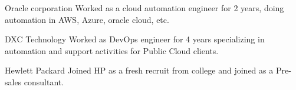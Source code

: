 

\begin{cvskills}

  \cvskill
    {Oracle corporation} %
    {Worked as a cloud automation engineer for 2 years, doing automation in AWS, Azure, oracle cloud, etc.} %
  

  \cvskill
    {DXC Technology} %
    {Worked as DevOps engineer for 4 years specializing in automation and support activities for Public Cloud clients. } %

  \cvskill
    {Hewlett Packard} %
    {Joined HP as a fresh recruit from college and joined as a Pre-sales consultant.} %

\end{cvskills}

